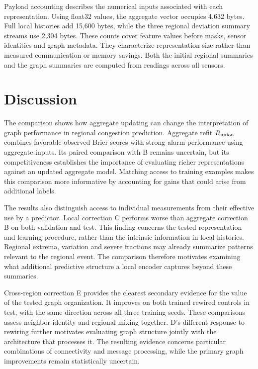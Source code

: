 \documentclass{llncs}
\begin{document}
Payload accounting describes the numerical inputs associated with each representation. Using float32 values, the aggregate vector occupies 4,632 bytes. Full local histories add 15,600 bytes, while the three regional deviation summary streams use 2,304 bytes. These counts cover feature values before masks, sensor identities and graph metadata. They characterize representation size rather than measured communication or memory savings. Both the initial regional summaries and the graph summaries are computed from readings across all sensors.





\section{Discussion}
The comparison shows how aggregate updating can change the interpretation of graph performance in regional congestion prediction. Aggregate refit $R_{\rm union}$ combines favorable observed Brier scores with strong alarm performance using aggregate inputs. Its paired comparison with B remains uncertain, but its competitiveness establishes the importance of evaluating richer representations against an updated aggregate model. Matching access to training examples makes this comparison more informative by accounting for gains that could arise from additional labels.

The results also distinguish access to individual measurements from their effective use by a predictor. Local correction C performs worse than aggregate correction B on both validation and test. This finding concerns the tested representation and learning procedure, rather than the intrinsic information in local histories. Regional extrema, variation and severe fractions may already summarize patterns relevant to the regional event. The comparison therefore motivates examining what additional predictive structure a local encoder captures beyond these summaries.

Cross-region correction E provides the clearest secondary evidence for the value of the tested graph organization. It improves on both trained rewired controls in test, with the same direction across all three training seeds. These comparisons assess neighbor identity and regional mixing together. D's different response to rewiring further motivates evaluating graph structure jointly with the architecture that processes it. The resulting evidence concerns particular combinations of connectivity and message processing, while the primary graph improvements remain statistically uncertain.
\end{document}
